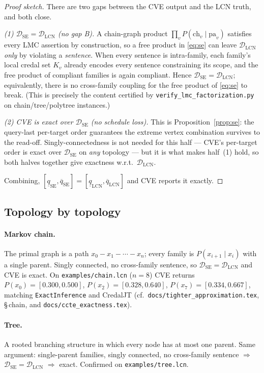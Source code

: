 \documentclass[11pt]{article}
\newcommand{\lo}{\underline}
\newcommand{\hi}{\overline}
\newcommand{\DSE}{\mathcal{D}_{\mathrm{SE}}}
\newcommand{\DLCN}{\mathcal{D}_{\mathrm{LCN}}}
\begin{document}
\begin{proof}[Proof sketch]
There are two gaps between the CVE output and the LCN truth, and both close.

\emph{(1) $\DSE=\DLCN$ (no gap B).} A chain-graph product $\prod_v P(\mathrm{ch}_v\mid\mathrm{pa}_v)$
satisfies every LMC assertion by construction, so a free product in \eqref{eq:se} can leave $\DLCN$
\emph{only} by violating a \emph{sentence}. When every sentence is intra-family, each family's local
credal set $K_v$ already encodes every sentence constraining its scope, and the free product of
compliant families is again compliant. Hence $\DSE=\DLCN$; equivalently, there is no cross-family
coupling for the free product of \eqref{eq:se} to break. (This is precisely the content certified by
\texttt{verify\_lmc\_factorization.py} on chain/tree/polytree instances.)

\emph{(2) CVE is exact over $\DSE$ (no schedule loss).} This is Proposition~\ref{prop:se}: the
query-last per-target order guarantees the extreme vertex combination survives to the read-off.
Singly-connectedness is not needed for this half --- CVE's per-target order is exact over $\DSE$ on
\emph{any} topology --- but it is what makes half~(1) hold, so both halves together give exactness
w.r.t.\ $\DLCN$.

Combining, $[\lo q_{\mathrm{SE}},\hi q_{\mathrm{SE}}]=[\lo q_{\mathrm{LCN}},\hi q_{\mathrm{LCN}}]$
and CVE reports it exactly.
\end{proof}

\subsection{Topology by topology}\label{sec:topo}

\paragraph{Markov chain.} The primal graph is a path $x_0\!-\!x_1\!-\!\cdots\!-\!x_n$; every family is
$P(x_{i+1}\mid x_i)$ with a single parent. Singly connected, no cross-family sentence, so
$\DSE=\DLCN$ and CVE is exact. On \texttt{examples/chain.lcn} ($n=8$) CVE returns
$P(x_0)=[0.300,0.500]$, $P(x_2)=[0.328,0.640]$, $P(x_7)=[0.334,0.667]$, matching
\texttt{ExactInference} and CredalJT (cf.\ \texttt{docs/tighter\_approximation.tex},
\S\,chain, and \texttt{docs/ccte\_exactness.tex}).

\paragraph{Tree.} A rooted branching structure in which every node has at most one parent. Same
argument: single-parent families, singly connected, no cross-family sentence $\Rightarrow$
$\DSE=\DLCN$ $\Rightarrow$ exact. Confirmed on \texttt{examples/tree.lcn}.
\end{document}
